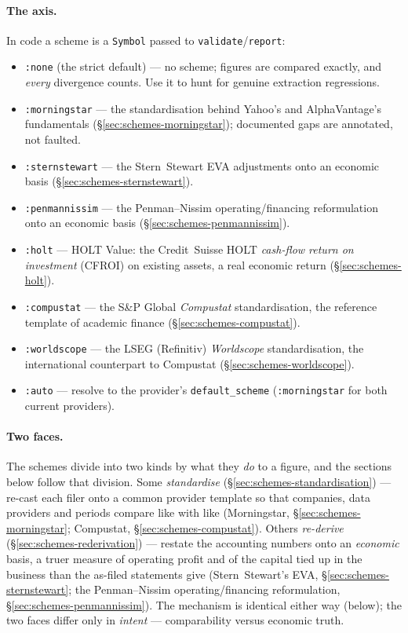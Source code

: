 \documentclass[11pt,a4paper]{report}
\begin{document}
\paragraph{The axis.} In code a scheme is a \texttt{Symbol} passed to \texttt{validate}/\texttt{report}:
\begin{itemize}
  \item \texttt{:none} (the strict default) --- no scheme; figures are compared exactly, and \emph{every}
    divergence counts. Use it to hunt for genuine extraction regressions.
  \item \texttt{:morningstar} --- the standardisation behind Yahoo's and AlphaVantage's fundamentals
    (\S\ref{sec:schemes-morningstar}); documented gaps are annotated, not faulted.
  \item \texttt{:sternstewart} --- the Stern~Stewart EVA adjustments onto an economic basis
    (\S\ref{sec:schemes-sternstewart}).
  \item \texttt{:penmannissim} --- the Penman--Nissim operating/financing reformulation onto an economic
    basis (\S\ref{sec:schemes-penmannissim}).
  \item \texttt{:holt} --- HOLT Value: the Credit~Suisse HOLT \emph{cash-flow return on investment} (CFROI)
    on existing assets, a real economic return (\S\ref{sec:schemes-holt}).
  \item \texttt{:compustat} --- the S\&P Global \emph{Compustat} standardisation, the reference template of
    academic finance (\S\ref{sec:schemes-compustat}).
  \item \texttt{:worldscope} --- the LSEG (Refinitiv) \emph{Worldscope} standardisation, the international
    counterpart to Compustat (\S\ref{sec:schemes-worldscope}).
  \item \texttt{:auto} --- resolve to the provider's \texttt{default\_scheme} (\texttt{:morningstar} for both
    current providers).
\end{itemize}

\paragraph{Two faces.} The schemes divide into two kinds by what they \emph{do} to a figure, and the sections
below follow that division. Some \emph{standardise} (\S\ref{sec:schemes-standardisation}) --- re-cast each
filer onto a common provider template so that companies, data providers and periods compare like with like
(Morningstar, \S\ref{sec:schemes-morningstar}; Compustat, \S\ref{sec:schemes-compustat}). Others
\emph{re-derive} (\S\ref{sec:schemes-rederivation}) --- restate the accounting numbers onto an
\emph{economic} basis, a truer measure of operating profit and of the capital tied up in the business than the
as-filed statements give (Stern~Stewart's EVA, \S\ref{sec:schemes-sternstewart}; the Penman--Nissim
operating/financing reformulation, \S\ref{sec:schemes-penmannissim}). The mechanism is identical either way
(below); the two faces differ only in \emph{intent} --- comparability versus economic truth.
\end{document}
